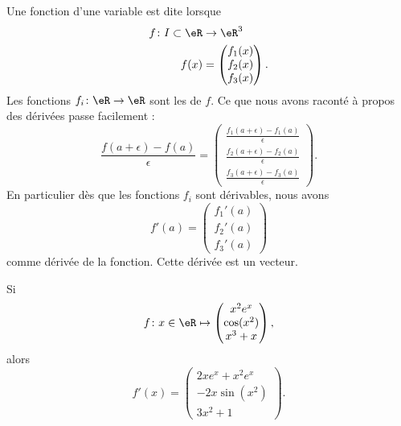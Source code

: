 Une fonction d'une variable est dite  lorsque
\begin{equation}
    \begin{aligned}
        f\colon I\subset \eR&\to \eR^3 \\
        f(x)&=\begin{pmatrix}
            f_1(x)    \\
            f_2(x)    \\
            f_3(x)
        \end{pmatrix}.
    \end{aligned}
\end{equation}
Les fonctions $f_i\colon \eR\to \eR$ sont les  de $f$. Ce que nous avons raconté à propos des dérivées passe facilement :
\begin{equation}
    \frac{ f(a+\epsilon)-f(a) }{ \epsilon }=
    \begin{pmatrix}
        \frac{ f_1(a+\epsilon)-f_1(a) }{ \epsilon }    \\
        \frac{ f_2(a+\epsilon)-f_2(a) }{ \epsilon }    \\
        \frac{ f_3(a+\epsilon)-f_3(a) }{ \epsilon }
    \end{pmatrix}.
\end{equation}
En particulier dès que les fonctions $f_i$ sont dérivables, nous avons
\begin{equation}
    f'(a)=\begin{pmatrix}
        f_1'(a)    \\
        f_2'(a)    \\
        f_3'(a)
    \end{pmatrix}
\end{equation}
comme dérivée de la fonction. Cette dérivée est un vecteur.

\begin{example}
    Si
    \begin{equation}
        f\colon x\in\eR\mapsto \begin{pmatrix}
            x^2 e^{x}    \\
            \cos(x^2)    \\
            x^3+x
        \end{pmatrix},
    \end{equation}
    alors
    \begin{equation}
        f'(x)=\begin{pmatrix}
            2xe^x+x^2e^x    \\
            -2x\sin(x^2)    \\
            3x^2+1
        \end{pmatrix}.
    \end{equation}
\end{example}

